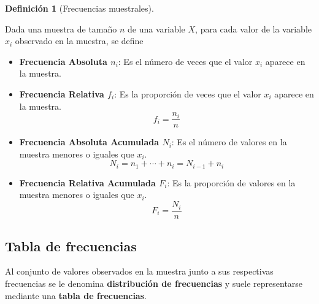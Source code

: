 \documentclass[
  a4paper,
]{scrreport}
\providecommand{\tightlist}{%
  \setlength{\itemsep}{0pt}\setlength{\parskip}{0pt}}\usepackage{longtable,booktabs,array}
\theoremstyle{definition}
\newtheorem{definition}{Definición}[chapter]
\theoremstyle{definition}
\theoremstyle{plain}
\theoremstyle{remark}
\begin{document}
\begin{definition}[Frecuencias
muestrales]\protect\hypertarget{def-frecuencias-muestrales}{}\label{def-frecuencias-muestrales}

Dada una muestra de tamaño \(n\) de una variable \(X\), para cada valor
de la variable \(x_i\) observado en la muestra, se define

\begin{itemize}
\tightlist
\item
  \textbf{Frecuencia Absoluta \(n_i\)}: Es el número de veces que el
  valor \(x_i\) aparece en la muestra.
\item
  \textbf{Frecuencia Relativa \(f_i\)}: Es la proporción de veces que el
  valor \(x_i\) aparece en la muestra. \[f_i = \frac{n_i}{n}\]
\item
  \textbf{Frecuencia Absoluta Acumulada \(N_i\)}: Es el número de
  valores en la muestra menores o iguales que \(x_i\).
  \[N_i = n_1 + \cdots + n_i = N_{i-1}+n_i\]
\item
  \textbf{Frecuencia Relativa Acumulada \(F_i\)}: Es la proporción de
  valores en la muestra menores o iguales que \(x_i\).
  \[F_i = \frac{N_i}{n}\]
\end{itemize}

\end{definition}

\hypertarget{tabla-de-frecuencias}{%
\subsection{Tabla de frecuencias}\label{tabla-de-frecuencias}}

Al conjunto de valores observados en la muestra junto a sus respectivas
frecuencias se le denomina \textbf{distribución de frecuencias} y suele
representarse mediante una \textbf{tabla de frecuencias}.
\end{document}
